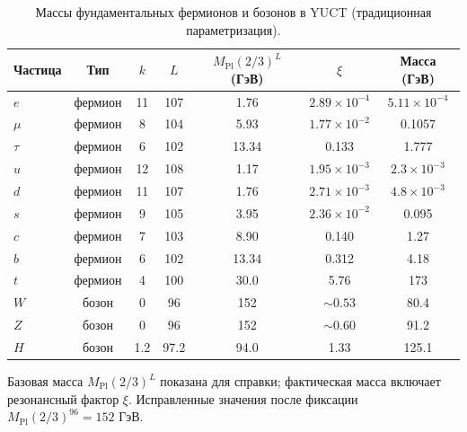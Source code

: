 \documentclass[11pt,a4paper]{article}
\begin{document}
	\vspace{2.0cm}
	
	\begin{table}[H]
		\centering
		\caption{Массы фундаментальных фермионов и бозонов в YUCT (традиционная параметризация).}
		\label{tab:fermions}
		\normalsize
		\begin{tabular}{l c c c c c c}
			\toprule
			Частица & Тип & \(k\) & \(L\) & \(M_{\mathrm{Pl}}(2/3)^L\) (ГэВ) & \(\xi\) & Масса (ГэВ) \\
			\midrule
			\(e\) & фермион & 11 & 107 & 1.76 & \(2.89\times10^{-4}\) & \(5.11\times10^{-4}\) \\
			\(\mu\) & фермион & 8  & 104 & 5.93 & \(1.77\times10^{-2}\) & 0.1057 \\
			\(\tau\) & фермион & 6  & 102 & 13.34 & 0.133 & 1.777 \\
			\(u\) & фермион & 12 & 108 & 1.17 & \(1.95\times10^{-3}\) & \(2.3\times10^{-3}\) \\
			\(d\) & фермион & 11 & 107 & 1.76 & \(2.71\times10^{-3}\) & \(4.8\times10^{-3}\) \\
			\(s\) & фермион & 9  & 105 & 3.95 & \(2.36\times10^{-2}\) & 0.095 \\
			\(c\) & фермион & 7  & 103 & 8.90 & 0.140 & 1.27 \\
			\(b\) & фермион & 6  & 102 & 13.34 & 0.312 & 4.18 \\
			\(t\) & фермион & 4  & 100 & 30.0 & 5.76 & 173 \\
			\midrule
			\(W\) & бозон & 0 & 96 & 152 & \(\sim0.53\) & 80.4 \\
			\(Z\) & бозон & 0 & 96 & 152 & \(\sim0.60\) & 91.2 \\
			\(H\) & бозон & 1.2 & 97.2 & 94.0 & 1.33 & 125.1 \\
			\bottomrule
		\end{tabular}
		\par\smallskip
		\footnotesize Базовая масса \(M_{\mathrm{Pl}}(2/3)^L\) показана для справки; фактическая масса включает резонансный фактор \(\xi\). Исправленные значения после фиксации \(M_{\mathrm{Pl}}(2/3)^{96}=152\) ГэВ.
	\end{table}
	
\end{document}
